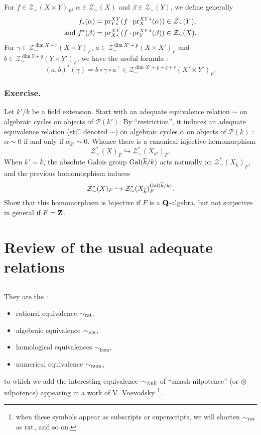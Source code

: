 \documentclass[../main.tex]{subfiles}
\begin{document}
\subsection{} For $f \in \mathcal{Z}_{\sim}(X \times Y)_F$, $\alpha \in \mathcal{Z}_{\sim}(X)$ and $\beta \in \mathcal{Z}_{\sim}(Y)$, we define generally
\begin{align*}
    f_*(\alpha) &= \mathrm{pr}^{XY}_{Y*}(f \cdot \mathrm{pr}^{XY*}_X (\alpha)) \in \mathcal{Z}_{\sim}(Y),\\
    \text{and } f^*(\beta) &= \mathrm{pr}^{XY}_{X*}(f \cdot \mathrm{pr}^{XY*}_Y(\beta)) \in \mathcal{Z}_{\sim}(X).
\end{align*}
For $\gamma \in \mathcal{Z}^{\dim X + r}_{\sim}(X \times Y)_F$, $a \in \mathcal{Z}^{\dim X' + p}_{\sim}(X \times X')_F$ and $b \in \mathcal{Z}^{\dim Y + q}_{\sim}(Y \times Y')_F$, we have the useful formula :
$$(a, b)^*(\gamma) = b \circ \gamma \circ a^{\top} \in \mathcal{Z}^{\dim X' + p + q + r}_{\sim}(X' \times Y')_F.$$

\subsubsection{Exercise.} Let $k'/k$ be a field extension.
Start with an adequate equivalence relation $\sim$ on algebraic cycles on objects of $\mathcal{P}(k')$.
By \enquote{restriction}, it induces an adequate equivalence relation (still denoted $\sim$) on algebraic cycles $\alpha$ on objects of $\mathcal{P}(k)$ : $\alpha \sim 0$ if and only if $\alpha_{k'} \sim 0$.
Whence there is a canonical injective homomorphism
$$\mathcal{Z}^*_{\sim}(X)_F \hookrightarrow \mathcal{Z}^*_{\sim}(X_{k'})_F.$$
When $k' = \overline{k}$, the absolute Galois group $\operatorname{Gal}(\overline{k}/k)$ acts naturally on $\mathcal{Z}^*_{\sim}(X_{\overline{k}})_F$, and the previous homomorphism induces
$$\mathcal{Z}^*_{\sim}(X)_F \hookrightarrow \mathcal{Z}^*_{\sim}(X_{\overline{k}})_F^{\operatorname{Gal}(\overline{k}/k)}.$$
Show that this homomorphism is bijective if $F$ is a $\mathbf{Q}$-algebra, but not surjective in general if $F = \mathbf{Z}$.

\section{Review of the usual adequate relations}

\subsection{} They are the :
\begin{itemize}
    \item rational equivalence $\sim_{\mathrm{rat}}$,
    \item algebraic equivalence $\sim_{\mathrm{alg}}$,
    \item homological equivalences $\sim_{\hom}$,
    \item numerical equivalence $\sim_{\mathrm{num}}$,
\end{itemize}
to which we add the interesting equivalence $\sim_{\otimes\mathrm{nil}}$ of \enquote{smash-nilpotence} (or $\otimes$-nilpotence) appearing in a work of V. Voevodsky \cite{voevodsky95}\footnote{when these symbols appear as subscripts or superscripts, we will shorten $\sim_{\mathrm{rat}}$ as $\mathrm{rat}$, and so on.}.
\end{document}
